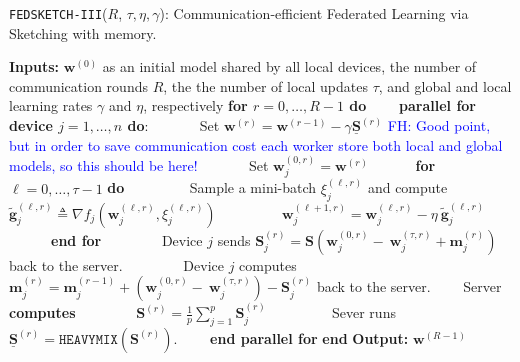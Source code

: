 \begin{algorithm}[H]
\caption{\texttt{FEDSKETCH-III}($R$, $\tau, \eta, \gamma$): Communication-efficient Federated Learning via Sketching with memory. }\label{Alg:ce-h-wm}
\begin{algorithmic}[1]
\State \textbf{Inputs:} $\boldsymbol{w}^{(0)}$ as an initial  model shared by all local devices, the number of communication rounds $R$, the the number of local updates $\tau$, and global and local learning rates $\gamma$ and $\eta$, respectively
\State \textbf{for $r=0, \ldots, R-1$ do}
\State $\qquad$\textbf{parallel for device $j=1,\ldots,n$ do}:
\State $\qquad\quad$ Set $\boldsymbol{w}^{(r)}=\boldsymbol{w}^{(r-1)}-\gamma\underline{\mathbf{S}}^{(r)}$  \textcolor{blue}{FH: Good point, but in order to save communication cost each worker store both local and global models, so this should be here!}
\State $\qquad\quad$ Set $\boldsymbol{w}_j^{(0,r)}=\boldsymbol{w}^{(r)}$ 
\State $\qquad\quad $\textbf{for} $\ell=0,\ldots,\tau-1$ \textbf{do}
\State $\qquad\quad\quad$ Sample a mini-batch $\xi_j^{(\ell,r)}$ and compute $\tilde{\mathbf{g}}_{j}^{(\ell,r)}\triangleq\nabla{f}_j(\boldsymbol{w}^{(\ell,r)}_j,\xi_j^{(\ell,r)})$
\State $\qquad\quad\quad$ $\boldsymbol{w}^{(\ell+1,r)}_{j}=\boldsymbol{w}^{(\ell,r)}_j-\eta~ \tilde{\mathbf{g}}_{j}^{(\ell,r)}$ \label{eq:update-rule-alg}
\State $\qquad\quad$\textbf{end for}
\State $\qquad\quad\quad$Device $j$ sends $\mathbf{S}_j^{(r)}=\mathbf{S}\left(\boldsymbol{w}_j^{(0,r)}-~{\boldsymbol{w}}_{j}^{(\tau,r)}+\mathbf{m}_j^{(r)}\right)$ back to the server.
\State $\qquad\quad\quad$Device $j$ computes $\mathbf{m}_j^{(r)}=\mathbf{m}_j^{(r-1)}+\left(\boldsymbol{w}_j^{(0,r)}-~{\boldsymbol{w}}_{j}^{(\tau,r)}\right)-\mathbf{S}_j^{(r)}$ back to the server.
\State $\qquad$Server \textbf{computes} 
\State $\qquad\qquad {\mathbf{S}}^{(r)}=\frac{1}{p}\sum_{j=1}^p\mathbf{S}^{(r)}_j$ %
\State $\qquad\qquad$ Sever runs $\underline{\mathbf{S}}^{(r)}= \texttt{HEAVYMIX}(\mathbf{S}^{(r)})$.
\State $\qquad$\textbf{end parallel for}
\State \textbf{end}
\State \textbf{Output:} ${\boldsymbol{w}}^{(R-1)}$
\vspace{- 0.1cm}
\end{algorithmic}
\end{algorithm}





